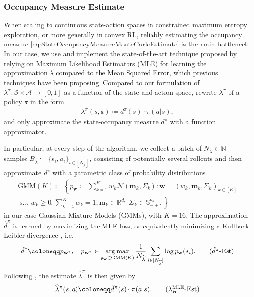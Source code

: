 \documentclass{article}
\theoremstyle{plain}
\theoremstyle{definition}
\theoremstyle{remark}
\def\NN{{\mathbb{N}}}
\def\SS{{\mathcal{S}}}
\def\AA{{\mathcal{A}}}
\newcommand{\define}{\coloneqq}
\DeclareMathOperator*{\argmax}{arg\,max}
\def\lambdaHat{{\widehat{\lambda}}}
\def\ss{{s}}
\def\NN{{\mathbb{N}}}
\newcommand{\setm}[1]{[#1]}
\def\aa{{a}}
\def\ss{{s}}
\def\wVec{{\textbf{w}}}
\begin{document}
\subsubsection{Occupancy Measure Estimate}
\label{sec:AppendixLambdaEstimateContinuous}
When scaling to continuous state-action spaces in constrained maximum
entropy exploration, or more generally in convex RL, reliably estimating
the occupancy measure \eqref{eq:StateOccupancyMeasureMonteCarloEstimate} is
the main bottleneck. In our case, we use and implement the state-of-the-art
technique proposed by \citet{barakatScalableGeneralUtility2025} relying on
Maximum Likelihood Estimators (MLE) for learning the approximation $\lambdaHat$
compared to the Mean Squared Error, which previous techniques have been
proposing. Compared to our formulation of $\lambda^{\pi}: \SS \times \AA
 \to [0,1]$ as a function of the state and action space,
\citet{barakatScalableGeneralUtility2025} rewrite $\lambda^{\pi}$ of a
policy $\pi$ in the form
\begin{align*}
 \lambda^{\pi}(\ss, \aa) \define d^{\pi}(\ss) \cdot \pi(\aa\vert\ss),
\end{align*}
and only approximate the state-occupancy measure $d^{\pi}$ with a function approximator.

In particular, at every step of the algorithm, we collect a batch of
$N_{\lambdaHat} \in \NN$ samples $B_{\lambdaHat} \define \{\ss_i,
 \aa_i\}_{i\in \setm{N_{\lambdaHat}}}$, consisting of potentially several
rollouts and then approximate $d^{\pi}$ with a parametric class of
probability distributions
\begin{align*}
 \mathrm{GMM}(K) \define
 \left\{p_\wVec \define  \sum_{k=1}^{K}
 w_k \mathcal{N}(\mathbf{m}_k, \Sigma_k) :
 \wVec = (w_k, \mathbf{m}_k, \Sigma_k)_{k\in \setm{K}} \right. \\
 \left.\;\mathrm{s.t.}\;
 w_k \geq 0, \sum_{k=1}^{K} w_k = 1,
 \mathbf{m}_k \in \mathbb{R}^{d_s},
 \Sigma_k \in \mathbb{S}^{d_s}_{++},
 \right\}
\end{align*}
in our case Gaussian Mixture Models (GMMs), with $K=16$. The approximation
$\hat{d}^{\pi}$ is learned by maximizing the MLE loss,
or equivalently minimizing a Kullback Leibler divergence
\cite{stuartExpressivityMultimodalContrastive2026}, i.e.
\begin{align}
 \hat{d}^{\pi} \define p_{\wVec^*}, \quad
 p_{\wVec^*} \in \argmax_{p_\wVec \in \mathrm{GMM}(K)} \frac{1}{N_{\lambdaHat}}
 \sum_{i\in \setm{N_{\lambdaHat}}} \log p_\wVec(\ss_i).
 \tag{$\hat{d}^{\pi}$-Est}
 \label{eq:CartpoleStateOccupancyMeasEstimate}
\end{align}
Following \citet{barakatScalableGeneralUtility2025}, the estimate $\lambdaHat^{\pi}$
is then given by
\begin{align}
 \lambdaHat^{\pi}(\ss, \aa) \define \hat{d}^{\pi}(\ss) \cdot \pi(\aa \vert \ss).
 \tag{$\lambda^{\mathrm{MLE}}_H$-Est}
 \label{eq:StateOccupancyMeasureMLE}
\end{align}
\end{document}
